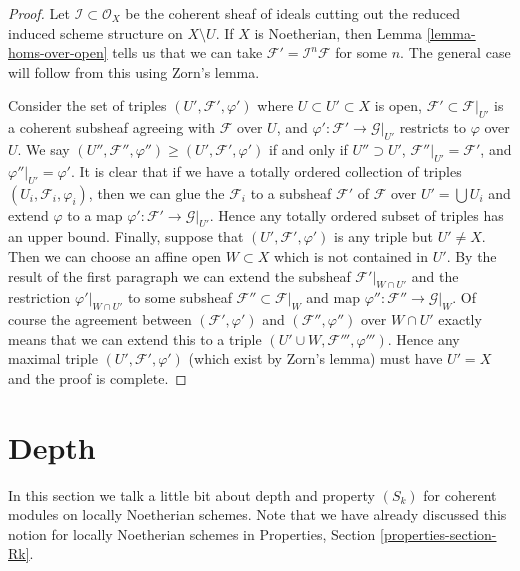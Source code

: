 \documentclass{stacks-project}
\theoremstyle{plain}
\theoremstyle{definition}
\theoremstyle{remark}
\numberwithin{equation}{subsection}
\begin{document}
\begin{proof}
Let $\mathcal{I} \subset \mathcal{O}_X$ be the coherent sheaf of ideals
cutting out the reduced induced scheme structure on $X \setminus U$.
If $X$ is Noetherian, then Lemma \ref{lemma-homs-over-open} tells us that
we can take $\mathcal{F}' = \mathcal{I}^n\mathcal{F}$
for some $n$. The general case will follow from this using Zorn's lemma.

\medskip\noindent
Consider the set of triples $(U', \mathcal{F}', \varphi')$ where
$U \subset U' \subset X$ is open, $\mathcal{F}' \subset \mathcal{F}|_{U'}$
is a coherent subsheaf agreeing with $\mathcal{F}$ over $U$, and
$\varphi' : \mathcal{F}' \to \mathcal{G}|_{U'}$ restricts to
$\varphi$ over $U$. We say
$(U'', \mathcal{F}'', \varphi'') \geq (U', \mathcal{F}', \varphi')$
if and only if $U'' \supset U'$, $\mathcal{F}''|_{U'} = \mathcal{F}'$,
and $\varphi''|_{U'} = \varphi'$.
It is clear that if we have a totally ordered collection
of triples $(U_i, \mathcal{F}_i, \varphi_i)$, then we
can glue the $\mathcal{F}_i$ to a subsheaf $\mathcal{F}'$ of $\mathcal{F}$
over $U' = \bigcup U_i$ and extend $\varphi$ to a map
$\varphi' : \mathcal{F}' \to \mathcal{G}|_{U'}$.
Hence any totally ordered subset of triples has an upper bound.
Finally, suppose that $(U', \mathcal{F}', \varphi')$
is any triple but $U' \not = X$. Then we can choose an
affine open $W \subset X$ which is not contained in $U'$.
By the result of the first paragraph we can extend
the subsheaf $\mathcal{F}'|_{W \cap U'}$ and the restriction
$\varphi'|_{W \cap U'}$ to some subsheaf $\mathcal{F}'' \subset \mathcal{F}|_W$
and map $\varphi'' : \mathcal{F}'' \to \mathcal{G}|_W$.
Of course the agreement between $(\mathcal{F}', \varphi')$ and
$(\mathcal{F}'', \varphi'')$ over $W \cap U'$ exactly means that
we can extend this to a triple $(U' \cup W, \mathcal{F}''', \varphi''')$.
Hence any maximal triple $(U', \mathcal{F}', \varphi')$
(which exist by Zorn's lemma) must have $U' = X$ and the
proof is complete.
\end{proof}









\section{Depth}
\label{section-depth}

\noindent
In this section we talk a little bit about depth and property
$(S_k)$ for coherent modules on locally Noetherian schemes.
Note that we have already discussed this notion for locally
Noetherian schemes in Properties, Section \ref{properties-section-Rk}.
\end{document}
